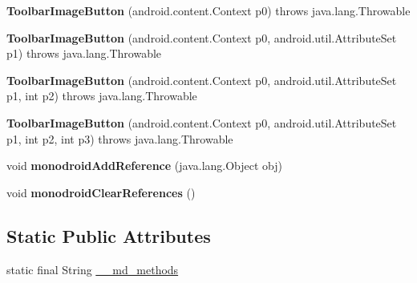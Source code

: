 \begin{DoxyCompactItemize}
\item 
\mbox{\label{classmd5b60ffeb829f638581ab2bb9b1a7f4f3f_1_1_toolbar_image_button_a5b82e6fb711d83ddca88b91ff6a3fac3}} 
{\bfseries Toolbar\+Image\+Button} (android.\+content.\+Context p0)  throws java.\+lang.\+Throwable 	
\item 
\mbox{\label{classmd5b60ffeb829f638581ab2bb9b1a7f4f3f_1_1_toolbar_image_button_ae32a9e49a9fa0aa0435c1f35ef1f08a5}} 
{\bfseries Toolbar\+Image\+Button} (android.\+content.\+Context p0, android.\+util.\+Attribute\+Set p1)  throws java.\+lang.\+Throwable 	
\item 
\mbox{\label{classmd5b60ffeb829f638581ab2bb9b1a7f4f3f_1_1_toolbar_image_button_aea3b6b5b763a9df42845f08ae1587edc}} 
{\bfseries Toolbar\+Image\+Button} (android.\+content.\+Context p0, android.\+util.\+Attribute\+Set p1, int p2)  throws java.\+lang.\+Throwable 	
\item 
\mbox{\label{classmd5b60ffeb829f638581ab2bb9b1a7f4f3f_1_1_toolbar_image_button_a8927daf324fde7412a4fbef5898d7d91}} 
{\bfseries Toolbar\+Image\+Button} (android.\+content.\+Context p0, android.\+util.\+Attribute\+Set p1, int p2, int p3)  throws java.\+lang.\+Throwable 	
\item 
\mbox{\label{classmd5b60ffeb829f638581ab2bb9b1a7f4f3f_1_1_toolbar_image_button_a11accc7abc6a78cc08dc6f299d74ad94}} 
void {\bfseries monodroid\+Add\+Reference} (java.\+lang.\+Object obj)
\item 
\mbox{\label{classmd5b60ffeb829f638581ab2bb9b1a7f4f3f_1_1_toolbar_image_button_a584b37224644170816eb54f59c59945c}} 
void {\bfseries monodroid\+Clear\+References} ()
\end{DoxyCompactItemize}
\subsection*{Static Public Attributes}
\begin{DoxyCompactItemize}
\item 
static final String \hyperlink{classmd5b60ffeb829f638581ab2bb9b1a7f4f3f_1_1_toolbar_image_button_a581edb38bbe374fe7d3ceed23ee694df}{\+\_\+\+\_\+md\+\_\+methods}
\end{DoxyCompactItemize}


